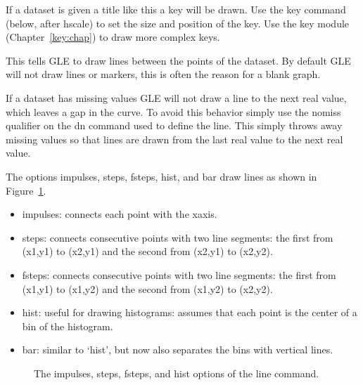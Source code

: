 \begin{commanddescription}
\item[{\sf dn key {\it "Dataset title"}}  ]
If a dataset is given a title like this a key will be drawn.  Use the
{\sf key} command (below, after hscale) to set the size and
position of the key.  Use the key module (Chapter~\ref{key:chap}) to draw
more complex keys.

\item[{\sf dn line [impulses] [steps] [fsteps] [hist] [bar]}]
This tells GLE to draw lines between the points of the dataset.  By
default GLE will not draw lines or markers, this is often the reason
for a blank graph.

If a dataset has missing values GLE will not draw a line to the next
real value, which leaves a gap in the curve.  To avoid this
behavior simply use the {\sf nomiss} qualifier on the {\sf dn} command
used to define the line. This simply throws away missing values so that
lines are drawn from the last real value to the next real value.

The options {\sf impulses}, {\sf steps}, {\sf fsteps}, {\sf hist}, and {\sf bar} draw lines as shown in Figure~\ref{linemode:fig}.
\begin{itemize}
\item {\sf impulses}: connects each point with the xaxis.

\item {\sf steps}: connects consecutive points with two line segments: the first from (x1,y1) to (x2,y1) and the second from (x2,y1) to (x2,y2).

\item {\sf fsteps}: connects consecutive points with two line segments: the first from (x1,y1) to (x1,y2) and the second from (x1,y2) to (x2,y2).

\item {\sf hist}: useful for drawing histograms: assumes that each point is the center of a bin of the histogram.

\item {\sf bar}: similar to `{\sf hist}', but now also separates the bins with vertical lines.
\end{itemize}

\begin{figure}[tb]
\centering

\caption{\label{linemode:fig}The {\sf impulses}, {\sf steps}, {\sf fsteps}, and {\sf hist} options of the line command.}
\end{figure}


\end{commanddescription}
